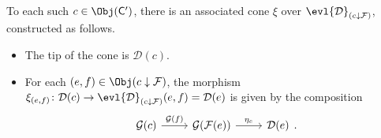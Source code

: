 \documentclass[notes.tex]{subfiles}
\begin{document}
To each such $c \in \Obj(\mathsf{C}')$, there is an associated cone $\xi$ over $\evl{\mathcal{D}}_{(c \downarrow \mathcal{F})}$, constructed as follows.

\begin{itemize}
  \item The tip of the cone is $\mathcal{D}(c)$.

  \item For each $(e, f) \in \Obj(c \downarrow \mathcal{F})$, the morphism $\xi_{(e, f)}\colon\mathcal{D}(c) \to \evl{\mathcal{D}}_{(c \downarrow \mathcal{F})}(e, f) = \mathcal{D}(e)$ is given by the composition
    \begin{equation*}
      \begin{tikzcd}
        \mathcal{G}(c)
        \arrow[r, "\mathcal{G}(f)"]
        & \mathcal{G}(\mathcal{F}(e))
        \arrow[r, "\eta_{e}"]
        & \mathcal{D}(e)
      \end{tikzcd}.
    \end{equation*}
\end{itemize}
\end{document}
